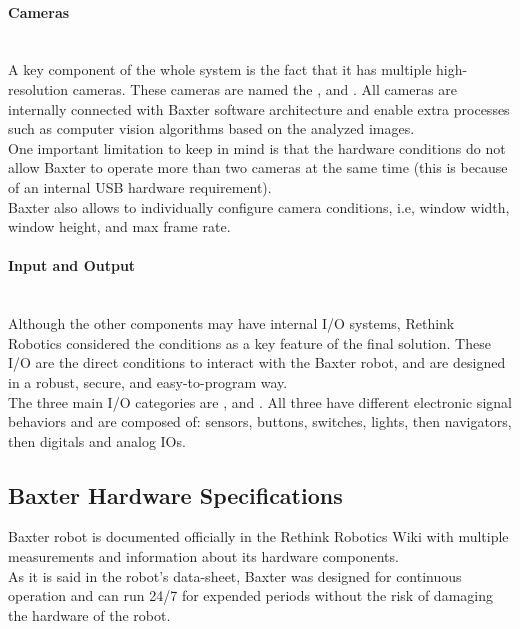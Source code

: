 \documentclass[11pt]{report} %
\newcommand{\subsubsubsection}[1]{\paragraph{#1}\mbox{}\\}
\begin{document}
\subsubsubsection{Cameras}

A key component of the whole system is the fact that it has multiple high-resolution cameras. These cameras are named the ,  and . All cameras are internally connected with Baxter software architecture and enable extra processes such as computer vision algorithms based on the analyzed images.\\

One important limitation to keep in mind is that the hardware conditions do not allow Baxter to operate more than two cameras at the same time (this is because of an internal USB hardware requirement).\\

Baxter also allows to individually configure camera conditions, i.e, window width, window height, and max frame rate.\\


\subsubsubsection{Input and Output}

Although the other components may have internal I/O systems, Rethink Robotics considered the  conditions as a key feature of the final solution. These I/O are the direct conditions to interact with the Baxter robot, and are designed in a robust, secure, and easy-to-program way.\\

The three main I/O categories are ,  and  \citep{cite_baxter_io_wiki}. All three have different electronic signal behaviors and are composed of: sensors, buttons, switches, lights, then navigators, then digitals and analog IOs.\\


\subsection{Baxter Hardware Specifications}

Baxter robot is documented officially in the Rethink Robotics Wiki with multiple measurements and information about its hardware components.\\

As it is said in the robot's data-sheet, Baxter was designed for continuous operation and can run 24/7 for expended periods without the risk of damaging the hardware of the robot\citep{cite_baxter_hardware_specifications}. \\
\end{document}
